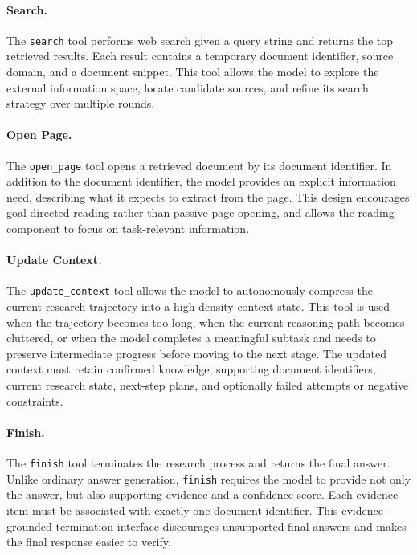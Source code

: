 \documentclass[]{selfevolagent}
\theoremstyle{plain}
\theoremstyle{definition}
\theoremstyle{remark}
\begin{document}
\paragraph{Search.}
The \texttt{search} tool performs web search given a query string and returns the top retrieved results. Each result contains a temporary document identifier, source domain, and a document snippet. This tool allows the model to explore the external information space, locate candidate sources, and refine its search strategy over multiple rounds.

\paragraph{Open Page.}
The \texttt{open\_page} tool opens a retrieved document by its document identifier. In addition to the document identifier, the model provides an explicit information need, describing what it expects to extract from the page. This design encourages goal-directed reading rather than passive page opening, and allows the reading component to focus on task-relevant information.

\paragraph{Update Context.}
The \texttt{update\_context} tool allows the model to autonomously compress the current research trajectory into a high-density context state. This tool is used when the trajectory becomes too long, when the current reasoning path becomes cluttered, or when the model completes a meaningful subtask and needs to preserve intermediate progress before moving to the next stage. The updated context must retain confirmed knowledge, supporting document identifiers, current research state, next-step plans, and optionally failed attempts or negative constraints.

\paragraph{Finish.}
The \texttt{finish} tool terminates the research process and returns the final answer. Unlike ordinary answer generation, \texttt{finish} requires the model to provide not only the answer, but also supporting evidence and a confidence score. Each evidence item must be associated with exactly one document identifier. This evidence-grounded termination interface discourages unsupported final answers and makes the final response easier to verify.
\end{document}
